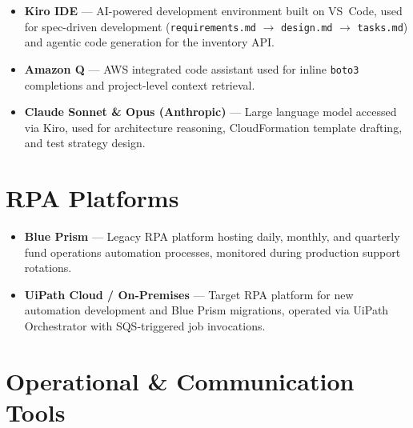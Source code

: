 \begin{itemize}

    \item \textbf{Kiro IDE} --- AI-powered development environment
          built on VS~Code, used for spec-driven development
          (\texttt{requirements.md} $\to$ \texttt{design.md} $\to$
          \texttt{tasks.md}) and agentic code generation for the
          inventory API.

    \item \textbf{Amazon Q} --- AWS integrated code assistant used
          for inline \texttt{boto3} completions and project-level
          context retrieval.

    \item \textbf{Claude Sonnet & Opus (Anthropic)} --- Large language model
          accessed via Kiro, used for architecture reasoning,
          CloudFormation template drafting, and test strategy design.

\end{itemize}

\section{RPA Platforms}
\label{sec:tools_rpa}

\begin{itemize}

    \item \textbf{Blue Prism} --- Legacy RPA platform hosting
          daily, monthly, and quarterly fund operations automation
          processes, monitored during production support rotations.

    \item \textbf{UiPath Cloud / On-Premises} --- Target RPA platform
          for new automation development and Blue Prism migrations,
          operated via UiPath Orchestrator with SQS-triggered job
          invocations.

\end{itemize}

\section{Operational \& Communication Tools}
\label{sec:tools_ops}

